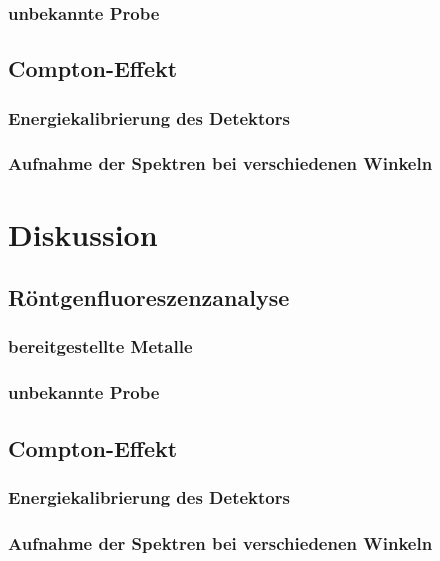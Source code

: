 \documentclass[12pt,english,ngerman]{scrartcl}
\begin{document}
\subsubsection{unbekannte Probe}


\subsection{Compton-Effekt}

\subsubsection{Energiekalibrierung des Detektors}

\subsubsection{Aufnahme der Spektren bei verschiedenen Winkeln}



\section{Diskussion}\label{sec:diskussion}

\subsection{Röntgenfluoreszenzanalyse}

\subsubsection{bereitgestellte Metalle}


\subsubsection{unbekannte Probe}


\subsection{Compton-Effekt}

\subsubsection{Energiekalibrierung des Detektors}

\subsubsection{Aufnahme der Spektren bei verschiedenen Winkeln}
\end{document}
